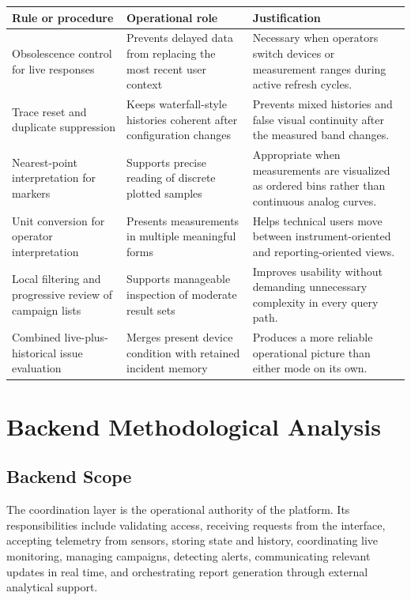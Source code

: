 \documentclass[11pt,a4paper]{article}
\begin{document}
\begin{longtable}{@{}p{}p{}p{}@{}}
\toprule
\textbf{Rule or procedure} & \textbf{Operational role} & \textbf{Justification} \\
\midrule
\endhead
Obsolescence control for live responses & Prevents delayed data from replacing the most recent user context & Necessary when operators switch devices or measurement ranges during active refresh cycles. \\
Trace reset and duplicate suppression & Keeps waterfall-style histories coherent after configuration changes & Prevents mixed histories and false visual continuity after the measured band changes. \\
Nearest-point interpretation for markers & Supports precise reading of discrete plotted samples & Appropriate when measurements are visualized as ordered bins rather than continuous analog curves. \\
Unit conversion for operator interpretation & Presents measurements in multiple meaningful forms & Helps technical users move between instrument-oriented and reporting-oriented views. \\
Local filtering and progressive review of campaign lists & Supports manageable inspection of moderate result sets & Improves usability without demanding unnecessary complexity in every query path. \\
Combined live-plus-historical issue evaluation & Merges present device condition with retained incident memory & Produces a more reliable operational picture than either mode on its own. \\
\bottomrule
\end{longtable}

\section{Backend Methodological Analysis}

\subsection{Backend Scope}
The coordination layer is the operational authority of the platform. Its responsibilities include validating access, receiving requests from the interface, accepting telemetry from sensors, storing state and history, coordinating live monitoring, managing campaigns, detecting alerts, communicating relevant updates in real time, and orchestrating report generation through external analytical support.
\end{document}
